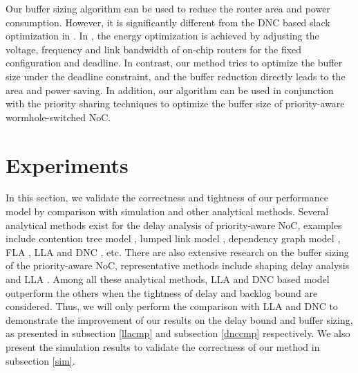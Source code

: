 \documentclass[preprint]{elsarticle}
\begin{document}
Our buffer sizing algorithm can be used to reduce the router area and power consumption. However, it is significantly different from the DNC based slack optimization in \cite{6560630}. In \cite{6560630}, the energy optimization is achieved by adjusting the voltage, frequency and link bandwidth of on-chip routers for the fixed configuration and deadline. In contrast, our method tries to optimize the buffer size under the deadline constraint, and the buffer reduction directly leads to the area and power saving. In addition, our algorithm can be used in conjunction with the priority sharing techniques \cite{5161497} to optimize the buffer size of priority-aware wormhole-switched NoC.

\section{Experiments}\label{experiments}
In this section, we validate the correctness and tightness of our performance model by comparison with simulation and other analytical methods. Several analytical methods exist for the delay analysis of priority-aware NoC, examples include contention tree model \cite{LuJS05}, lumped link model \cite{707545}, dependency graph model \cite{708526}, FLA \cite{Shi:2008:RCA:1397757.1397996}, LLA \cite{73} and DNC \cite{Qian489900}, etc. There are also extensive research on the buffer sizing of the priority-aware NoC, representative methods include shaping delay analysis \cite{Manolache:2006:BSO:1131481.1131683} and LLA \cite{189}. Among all these analytical methods, LLA \cite{73}\cite{189} and DNC \cite{Qian489900} based model outperform the others when the tightness of delay and backlog bound are considered. Thus, we will only perform the comparison with LLA and DNC to demonstrate the improvement of our results on the delay bound and buffer sizing, as presented in subsection \ref{llacmp} and subsection \ref{dnccmp} respectively. We also present the simulation results to validate the correctness of our method in subsection \ref{sim}.
\end{document}
